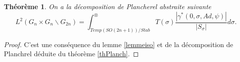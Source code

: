 \documentclass{amsart}
\newtheorem{theoreme}{Théorème}[section]
\begin{document}
\begin{theoreme}
On a la décomposition de Plancherel abstraite suivante
\begin{equation}
L^2(G_n \times G_n \backslash G_{2n}) = \int^{\otimes}_{Temp(SO(2n+1))/Stab} T(\sigma) \frac{|\gamma^*(0, \sigma, Ad, \psi)|}{|S_\sigma|} d\sigma.
\end{equation}
\end{theoreme}

\begin{proof}
C'est une conséquence du lemme \ref{lemmeiso} et de la décomposition de Planchrel déduite du théorème \ref{thPlanch}.
\end{proof}

 
 
\end{document}
